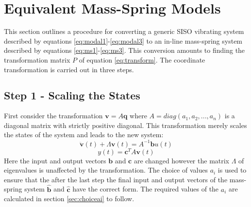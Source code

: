 \documentclass{mbd_fullpaper}
\begin{document}
\section{Equivalent Mass-Spring Models}
This section outlines a procedure for converting a generic SISO vibrating system described by equations \ref{eq:modal1}-\ref{eq:modal3} to an in-line mass-spring system described by equations \ref{eq:ms1}-\ref{eq:ms3}.
This conversion amounts to finding the transformation matrix $P$ of equation \ref{eq:transform}.
The coordinate transformation is carried out in three steps.

\subsection{Step 1 - Scaling the States}
First consider the transformation $\mathbf{v} = A \mathbf{q}$ where $A = diag(a_1, a_2, ..., a_n)$ is a diagonal matrix with strictly positive diagonal.
This transformation merely scales the states of the system and leads to the new system:
\begin{equation}
\ddot{\mathbf{v}}(t) +  \Lambda \mathbf{v}(t) =  A^{-1} \mathbf{b}u(t)
\label{eq:scaled1}
\end{equation}
\begin{equation}
y(t) = \mathbf{c}^T  A \mathbf{v}(t)
\label{eq:scaled2}
\end{equation}
Here the input and output vectors $\mathbf{b}$ and $\mathbf{c}$ are changed however the matrix $\Lambda$ of eigenvalues is unaffected by the transformation.
The choice of values $a_i$ is used to ensure that the after the last step the final input and output vectors of the mass-spring system $\mathbf{\hat{b}}$ and $\mathbf{\hat{c}}$ have the correct form.
The required values of the $a_i$ are calculated in section \ref{sec:choiceai} to follow.
\end{document}
